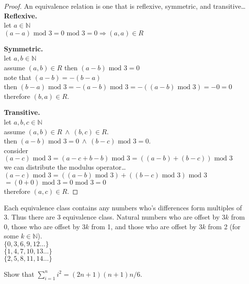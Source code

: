 \documentclass[12pt]{jhwhw}
\begin{document}
\solution
\begin{proof} An equivalence relation is one that is reflexive, symmetric, and transitive\dots \\

\bigbreak
\textbf{Reflexive.} \\
	let $a\in \mathbb{N}$ \\
	$(a - a) \text{ mod }3 = 0 \text{ mod } 3 = 0 \Rightarrow (a, a) \in R$

\bigbreak
\textbf{Symmetric.} \\
	let $a,b\in \mathbb{N}$ \\
	assume $(a,b)\in R$ then $(a-b) \text{ mod } 3 = 0$ \\
	note that $(a-b) = -(b-a)$ \\
	then $(b-a) \text{ mod } 3 = -(a-b) \text{ mod } 3 = -((a-b) \text{ mod } 3) = -0 = 0$ \\
	therefore $(b,a) \in R$.

\bigbreak
\textbf{Transitive.} \\
	let $a,b,c\in \mathbb{N}$ \\
	assume $(a,b)\in R\ \wedge\ (b,c)\in R$. \\
	then $(a-b) \text{ mod } 3 = 0\ \wedge\ (b-c) \text{ mod } 3 = 0$. \\
	consider $(a-c) \text{ mod } 3 = (a-c+b-b) \text{ mod } 3 = ((a-b)+(b-c)) \text{ mod } 3$ \\
	we can distribute the modulus operator\dots \\
	$(a-c)\text{ mod }3 = ((a-b)\text{ mod }3)+((b-c)\text{ mod }3)\text{ mod }3$ \\
	$= (0 + 0)\text{ mod }3 = 0\text{ mod }3 = 0$ \\
	therefore $(a,c)\in R$.

\end{proof}

Each equivalence class contains any numbers who's differences form multiples of 3.
Thus there are 3 equivalence class. Natural numbers who are offset by $3k$ from 0, those who are offset by $3k$
from 1, and those who are offset by $3k$ from 2 (for some $k \in \mathbb{N}$). \\
$\{0, 3, 6, 9, 12\dots\}$ \\
$\{1, 4, 7, 10, 13\dots\}$ \\
$\{2, 5, 8, 11, 14\dots\}$ \\

\problem{}

	Show that $\sum_{i=1}^{n} i^{2} = (2n+1)(n+1)n/6$.
\end{document}
